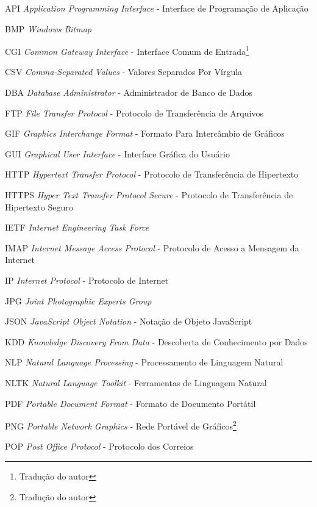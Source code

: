 \begin{siglas}
	\item[API] \textit{Application Programming Interface} - Interface de Programação de Aplicação
	\item[BMP] \textit{Windows Bitmap}
	\item[CGI] \textit{Common Gateway Interface} - Interface Comum de Entrada\footnote{Tradução do autor}
	\item[CSV] \textit{Comma-Separated Values} - Valores Separados Por Vírgula\footnotemark[1]
	\item[DBA] \textit{Database Administrator} - Administrador de Banco de Dados
	\item[FTP] \textit{File Transfer Protocol} - Protocolo de Transferência de Arquivos
	\item[GIF] \textit{Graphics Interchange Format} - Formato Para Intercâmbio de Gráficos\footnotemark[1]
	\item[GUI] \textit{Graphical User Interface} - Interface Gráfica do Usuário
	\item[HTTP] \textit{Hypertext Transfer Protocol} - Protocolo de Transferência de Hipertexto
	\item[HTTPS] \textit{Hyper Text Transfer Protocol Secure} - Protocolo de Transferência de Hipertexto Seguro
	\item[IETF] \textit{Internet Engineering Task Force}
	\item[IMAP] \textit{Internet Message Access Protocol} - Protocolo de Acesso a Mensagem da Internet
	\item[IP] \textit{Internet Protocol} - Protocolo de Internet
	\item[JPG] \textit{Joint Photographic Experts Group}
	\item[JSON] \textit{JavaScript Object Notation} - Notação de Objeto JavaScript\footnotemark[1] 
	\item[KDD] \textit{Knowledge Discovery From Data} - Descoberta de Conhecimento por Dados
	\item[NLP] \textit{Natural Language Processing} - Processamento de Linguagem Natural
	\item[NLTK] \textit{Natural Language Toolkit} - Ferramentas de Linguagem Natural\footnotemark[1]
	\item[PDF] \textit{Portable Document Format} - Formato de Documento Portátil\footnotemark[1]
	\item[PNG] \textit{Portable Network Graphics} - Rede Portável de Gráficos\footnote{Tradução do autor}
	\item[POP] \textit{Post Office Protocol} - Protocolo dos Correios

\end{siglas}
